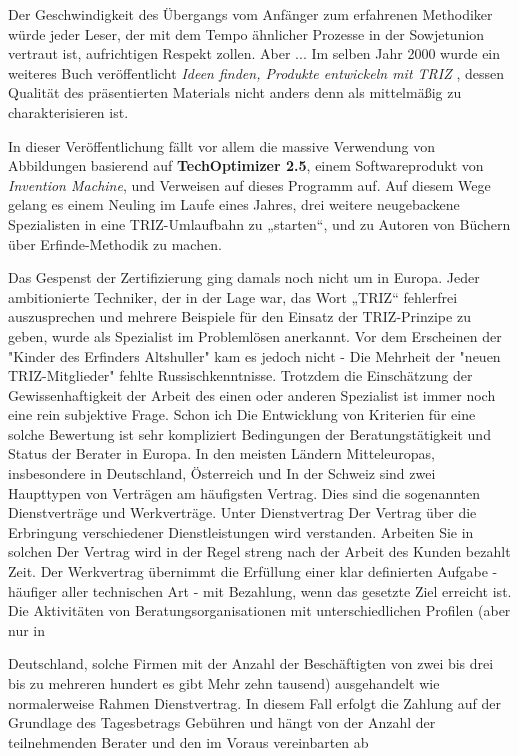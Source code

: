 \documentclass[11pt,a4paper]{article}
\begin{document}
Der Geschwindigkeit des Übergangs vom Anfänger zum erfahrenen Methodiker würde
jeder Leser, der mit dem Tempo ähnlicher Prozesse in der Sowjetunion vertraut
ist, aufrichtigen Respekt zollen. Aber ... Im selben Jahr 2000 wurde ein
weiteres Buch veröffentlicht \emph{Ideen finden, Produkte entwickeln mit TRIZ}
\cite{Gimpel2000}, dessen Qualität des präsentierten Materials nicht anders
denn als mittelmäßig zu charakterisieren ist.

In dieser Veröffentlichung fällt vor allem die massive Verwendung von
Abbildungen basierend auf \textbf{TechOptimizer 2.5}, einem Softwareprodukt
von \emph{Invention Machine}, und Verweisen auf dieses Programm auf. Auf
diesem Wege gelang es einem Neuling im Laufe eines Jahres, drei weitere
neugebackene Spezialisten in eine TRIZ-Umlaufbahn zu „starten“, und zu Autoren
von Büchern über Erfinde-Methodik zu machen.

Das Gespenst der Zertifizierung ging damals noch nicht um in Europa. Jeder
ambitionierte Techniker, der in der Lage war, das Wort „TRIZ“ fehlerfrei
auszusprechen und mehrere Beispiele für den Einsatz der TRIZ-Prinzipe zu
geben, wurde als Spezialist im Problemlösen anerkannt. Vor dem Erscheinen der
"Kinder des Erfinders Altshuller" kam es jedoch nicht - Die Mehrheit der
"neuen TRIZ-Mitglieder" fehlte Russischkenntnisse. Trotzdem die Einschätzung
der Gewissenhaftigkeit der Arbeit des einen oder anderen Spezialist ist immer
noch eine rein subjektive Frage. Schon ich Die Entwicklung von Kriterien für
eine solche Bewertung ist sehr kompliziert Bedingungen der Beratungstätigkeit
und Status der Berater in Europa.  In den meisten Ländern Mitteleuropas,
insbesondere in Deutschland, Österreich und In der Schweiz sind zwei
Haupttypen von Verträgen am häufigsten Vertrag. Dies sind die sogenannten
Dienstverträge und Werkverträge. Unter Dienstvertrag Der Vertrag über die
Erbringung verschiedener Dienstleistungen wird verstanden. Arbeiten Sie in
solchen Der Vertrag wird in der Regel streng nach der Arbeit des Kunden
bezahlt Zeit. Der Werkvertrag übernimmt die Erfüllung einer klar definierten
Aufgabe - häufiger aller technischen Art - mit Bezahlung, wenn das gesetzte
Ziel erreicht ist.  Die Aktivitäten von Beratungsorganisationen mit
unterschiedlichen Profilen (aber nur in

Deutschland, solche Firmen mit der Anzahl der Beschäftigten von zwei bis drei
bis zu mehreren hundert es gibt Mehr zehn tausend) ausgehandelt wie
normalerweise Rahmen Dienstvertrag. In diesem Fall erfolgt die Zahlung auf der
Grundlage des Tagesbetrags Gebühren und hängt von der Anzahl der teilnehmenden
Berater und den im Voraus vereinbarten ab


\end{document}

